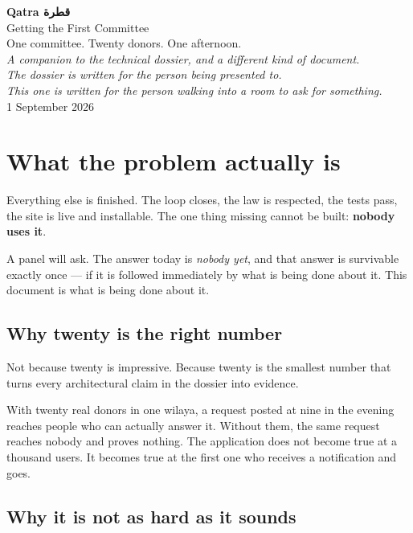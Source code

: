 \documentclass[11pt,a4paper]{article}
\newcommand{\ar}[1]{{\upshape\textarabic{#1}}}
\newcommand{\note}[1]{{\small\color{qatraGrey}\textit{#1}}}
\begin{document}
\begin{titlepage}
\centering
\vspace*{3cm}
{\Huge\bfseries\color{qatraNavy} Qatra \ar{قطرة}}\\[0.5em]
{\Large\color{qatraRed} Getting the First Committee}\\[2em]
{\large\color{qatraGrey} One committee. Twenty donors. One afternoon.}\\[3em]
\note{A companion to the technical dossier, and a different kind of document.\\
The dossier is written for the person being presented to.\\
This one is written for the person walking into a room to ask for something.}\\[2em]
{\small\color{qatraGrey} 1 September 2026}
\end{titlepage}

\tableofcontents
\newpage

\section{What the problem actually is}

Everything else is finished. The loop closes, the law is respected, the tests
pass, the site is live and installable. The one thing missing cannot be built:
\textbf{nobody uses it}.

A panel will ask. The answer today is \emph{nobody yet}, and that answer is
survivable exactly once — if it is followed immediately by what is being done
about it. This document is what is being done about it.

\subsection{Why twenty is the right number}

Not because twenty is impressive. Because twenty is the smallest number that
turns every architectural claim in the dossier into evidence.

With twenty real donors in one wilaya, a request posted at nine in the evening
reaches people who can actually answer it. Without them, the same request
reaches nobody and proves nothing. The application does not become true at a
thousand users. It becomes true at the first one who receives a notification
and goes.

\subsection{Why it is not as hard as it sounds}
\end{document}
